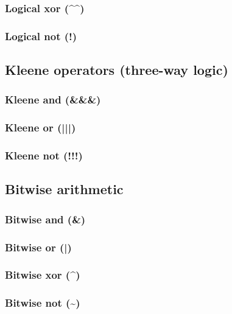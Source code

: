 \documentclass{article}
\theoremstyle{definition}
\begin{document}
\subsubsection{Logical xor (\^{}\^{})}
\libfcn{\^{}\^{}}

\subsubsection{Logical not (!)}
\libfcn{!}

\subsection{Kleene operators (three-way logic)}

\subsubsection{Kleene and (\&\&\&)}
\libfcn{\&\&\&}

\subsubsection{Kleene or (|||)}
\libfcn{|||}

\subsubsection{Kleene not (!!!)}
\libfcn{!!!}

\subsection{Bitwise arithmetic}

\subsubsection{Bitwise and (\&)}
\libfcn{\&}

\subsubsection{Bitwise or (|)}
\libfcn{|}

\subsubsection{Bitwise xor (\^{})}
\libfcn{\^{}}

\subsubsection{Bitwise not (\textasciitilde{})}
\end{document}
